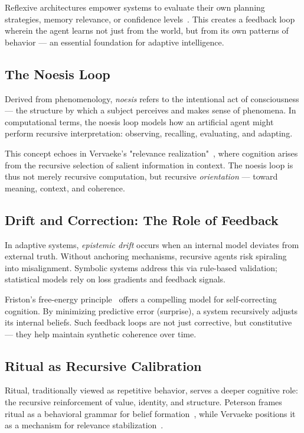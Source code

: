 \documentclass[twocolumn,10pt]{article}
\begin{document}
Reflexive architectures empower systems to evaluate their own planning strategies, memory relevance, or confidence levels~\cite{cox2005metacognition}. This creates a feedback loop wherein the agent learns not just from the world, but from its own patterns of behavior — an essential foundation for adaptive intelligence.

\subsection{The Noesis Loop}

Derived from phenomenology, \textit{noesis} refers to the intentional act of consciousness — the structure by which a subject perceives and makes sense of phenomena. In computational terms, the noesis loop models how an artificial agent might perform recursive interpretation: observing, recalling, evaluating, and adapting.

This concept echoes in Vervaeke’s "relevance realization"~\cite{vervaeke2019awakening}, where cognition arises from the recursive selection of salient information in context. The noesis loop is thus not merely recursive computation, but recursive \textit{orientation} — toward meaning, context, and coherence.

\subsection{Drift and Correction: The Role of Feedback}

In adaptive systems, \textit{epistemic drift} occurs when an internal model deviates from external truth. Without anchoring mechanisms, recursive agents risk spiraling into misalignment. Symbolic systems address this via rule-based validation; statistical models rely on loss gradients and feedback signals.

Friston’s free-energy principle~\cite{friston2010free} offers a compelling model for self-correcting cognition. By minimizing predictive error (surprise), a system recursively adjusts its internal beliefs. Such feedback loops are not just corrective, but constitutive — they help maintain synthetic coherence over time.

\subsection{Ritual as Recursive Calibration}

Ritual, traditionally viewed as repetitive behavior, serves a deeper cognitive role: the recursive reinforcement of value, identity, and structure. Peterson frames ritual as a behavioral grammar for belief formation~\cite{peterson1999maps}, while Vervaeke positions it as a mechanism for relevance stabilization~\cite{vervaeke2019awakening}.
\end{document}
